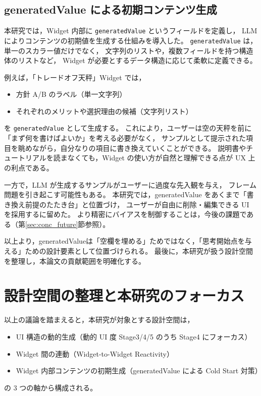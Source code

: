 \documentclass[senior,final,11pt,dvipdfmx]{iputit-thesis}
\begin{document}
\subsection{generatedValue による初期コンテンツ生成}

本研究では，Widget 内部に \texttt{generatedValue} というフィールドを定義し，
LLM によりコンテンツの初期値を生成する仕組みを導入した。
\texttt{generatedValue} は，単一のスカラー値だけでなく，
文字列のリストや，複数フィールドを持つ構造体のリストなど，
Widget が必要とするデータ構造に応じて柔軟に定義できる。

例えば，「トレードオフ天秤」Widget では，
\begin{itemize}
  \item 方針 A/B のラベル（単一文字列）
  \item それぞれのメリットや選択理由の候補（文字列リスト）
\end{itemize}
を \texttt{generatedValue} として生成する。
これにより，ユーザーは空の天秤を前に「まず何を書けばよいか」を考える必要がなく，
サンプルとして提示された項目を眺めながら，自分なりの項目に書き換えていくことができる。
説明書やチュートリアルを読まなくても，Widget の使い方が自然と理解できる点が UX 上の利点である。

一方で，LLM が生成するサンプルがユーザーに過度な先入観を与え，
フレーム問題を引き起こす可能性もある。
本研究では，generatedValue をあくまで「書き換え前提のたたき台」と位置づけ，
ユーザーが自由に削除・編集できる UI を採用するに留めた。
より精密にバイアスを制御することは，今後の課題である（第\ref{sec:conc_future}節参照）。

以上より，generatedValueは「空欄を埋める」ためではなく，「思考開始点を与える」ための設計要素として位置づけられる。 最後に，本研究が扱う設計空間を整理し，本論文の貢献範囲を明確化する。

\section{設計空間の整理と本研究のフォーカス}
\label{sec:design_space}

以上の議論を踏まえると，本研究が対象とする設計空間は，
\begin{itemize}
  \item UI 構造の動的生成（動的 UI 度 Stage3/4/5 のうち Stage4 にフォーカス）
  \item Widget 間の連動（Widget-to-Widget Reactivity）
  \item Widget 内部コンテンツの初期生成（generatedValue による Cold Start 対策）
\end{itemize}
の 3 つの軸から構成される。
\end{document}
